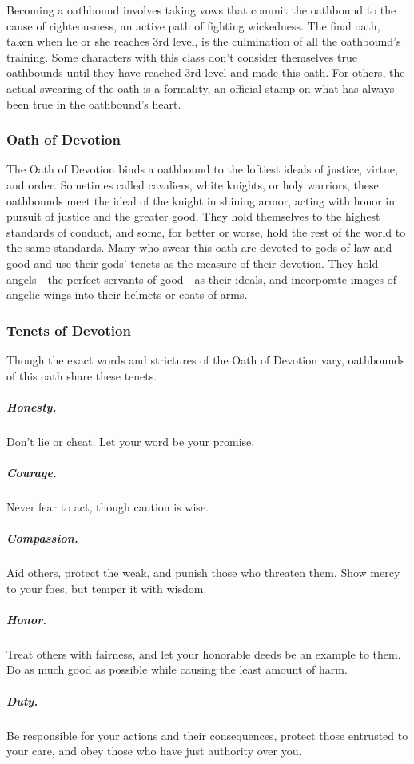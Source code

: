 Becoming a oathbound involves taking vows that commit the oathbound to the cause of righteousness, an active path of fighting wickedness. The final oath, taken when he or she reaches 3rd level, is the culmination of all the oathbound's training. Some characters with this class don't consider themselves true oathbounds until they have reached 3rd level and made this oath. For others, the actual swearing of the oath is a formality, an official stamp on what has always been true in the oathbound's heart.

\subsubsection{Oath of Devotion}

The Oath of Devotion binds a oathbound to the loftiest ideals of justice, virtue, and order. Sometimes called cavaliers, white knights, or holy warriors, these oathbounds meet the ideal of the knight in shining armor, acting with honor in pursuit of justice and the greater good. They hold themselves to the highest standards of conduct, and some, for better or worse, hold the rest of the world to the same standards. Many who swear this oath are devoted to gods of law and good and use their gods' tenets as the measure of their devotion. They hold angels—the perfect servants of good—as their ideals, and incorporate images of angelic wings into their helmets or coats of arms.

\subsubsection{Tenets of Devotion}

Though the exact words and strictures of the Oath of Devotion vary, oathbounds of this oath share these tenets.

\subparagraph*{Honesty.} Don't lie or cheat. Let your word be your promise.

\subparagraph*{Courage.} Never fear to act, though caution is wise.

\subparagraph*{Compassion.} Aid others, protect the weak, and punish those who threaten them. Show mercy to your foes, but temper it with wisdom.

\subparagraph*{Honor.} Treat others with fairness, and let your honorable deeds be an example to them. Do as much good as possible while causing the least amount of harm.

\subparagraph*{Duty.} Be responsible for your actions and their consequences, protect those entrusted to your care, and obey those who have just authority over you.

